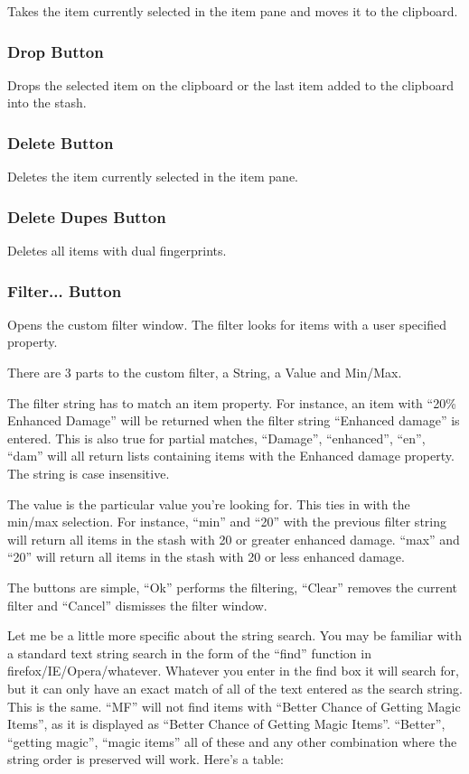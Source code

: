 \documentclass[a4paper,10pt]{article}
\begin{document}
Takes the item currently selected in the item pane and moves it to the clipboard.

\subsubsection{Drop Button}

Drops the selected item on the clipboard or the last item added to the clipboard into the stash.

\subsubsection{Delete Button}

Deletes the item currently selected in the item pane.

\subsubsection{Delete Dupes Button}

Deletes all items with dual fingerprints.

\subsubsection{Filter... Button}

Opens the custom filter window. The filter looks for items with a user specified property.

There are 3 parts to the custom filter, a String, a Value and Min/Max.

The filter string has to match an item property. For instance, an item with ``20\% Enhanced Damage'' will be returned when the filter string ``Enhanced damage'' is entered. This is also true for partial matches, ``Damage'', ``enhanced'', ``en'', ``dam'' will all return lists containing items with the Enhanced damage property. The string is case insensitive.

The value is the particular value you're looking for. This ties in with the min/max selection. For instance, ``min'' and ``20'' with the previous filter string will return all items in the stash with 20 or greater enhanced damage. ``max'' and ``20'' will return all items in the stash with 20 or less enhanced damage.

The buttons are simple, ``Ok'' performs the filtering, ``Clear'' removes the current filter and ``Cancel'' dismisses the filter window.

Let me be a little more specific about the string search. You may be familiar with a standard text string search in the form of the ``find'' function in firefox/IE/Opera/whatever. Whatever you enter in the find box it will search for, but it can only have an exact match of all of the text entered as the search string. This is the same. ``MF'' will not find items with ``Better Chance of Getting Magic Items'', as it is displayed as ``Better Chance of Getting Magic Items''. ``Better'', ``getting magic'', ``magic items'' all of these and any other combination where the string order is preserved will work. Here's a table:
\end{document}
